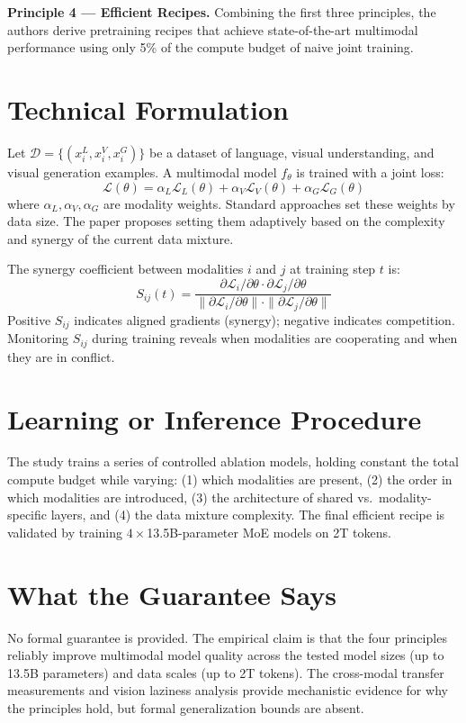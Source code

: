 \documentclass[10pt,twocolumn]{article}
\begin{document}
\textbf{Principle 4 --- Efficient Recipes.}
Combining the first three principles, the authors derive pretraining recipes
that achieve state-of-the-art multimodal performance using only 5\% of the
compute budget of naive joint training.

\section{Technical Formulation}

Let $\mathcal{D} = \{(x_i^L, x_i^V, x_i^G)\}$ be a dataset of language,
visual understanding, and visual generation examples. A multimodal model $f_\theta$
is trained with a joint loss:
\[
  \mathcal{L}(\theta) = \alpha_L \mathcal{L}_L(\theta) +
  \alpha_V \mathcal{L}_V(\theta) + \alpha_G \mathcal{L}_G(\theta)
\]
where $\alpha_L, \alpha_V, \alpha_G$ are modality weights. Standard approaches
set these weights by data size. The paper proposes setting them adaptively based
on the complexity and synergy of the current data mixture.

The synergy coefficient between modalities $i$ and $j$ at training step $t$ is:
\[
  S_{ij}(t) = \frac{\partial \mathcal{L}_i / \partial \theta \cdot
  \partial \mathcal{L}_j / \partial \theta}
  {\|\partial \mathcal{L}_i / \partial \theta\| \cdot
  \|\partial \mathcal{L}_j / \partial \theta\|}
\]
Positive $S_{ij}$ indicates aligned gradients (synergy); negative indicates
competition. Monitoring $S_{ij}$ during training reveals when modalities are
cooperating and when they are in conflict.

\section{Learning or Inference Procedure}

The study trains a series of controlled ablation models, holding constant the
total compute budget while varying: (1) which modalities are present, (2) the
order in which modalities are introduced, (3) the architecture of shared vs.\
modality-specific layers, and (4) the data mixture complexity. The final
efficient recipe is validated by training $4\times$13.5B-parameter MoE models
on 2T tokens.

\section{What the Guarantee Says}

No formal guarantee is provided. The empirical claim is that the four
principles reliably improve multimodal model quality across the tested model
sizes (up to 13.5B parameters) and data scales (up to 2T tokens). The
cross-modal transfer measurements and vision laziness analysis provide mechanistic
evidence for why the principles hold, but formal generalization bounds are absent.
\end{document}
